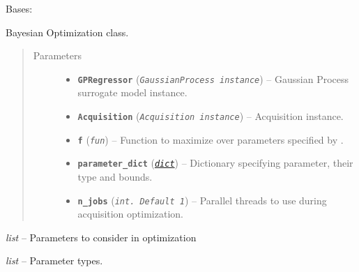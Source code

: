 \documentclass[letterpaper,10pt,english]{sphinxmanual}
\begin{document}
\begin{fulllineitems}
\label{pyGPGO.GPGO:pyGPGO.GPGO.GPGO}
Bases: \href{https://docs.python.org/2/library/functions.html\#object}{}

Bayesian Optimization class.
\begin{quote}\begin{description}
\item[{Parameters}] \leavevmode\begin{itemize}
\item {} 
\textbf{\texttt{GPRegressor}} (\emph{\texttt{GaussianProcess instance}}) -- Gaussian Process surrogate model instance.

\item {} 
\textbf{\texttt{Acquisition}} (\emph{\texttt{Acquisition instance}}) -- Acquisition instance.

\item {} 
\textbf{\texttt{f}} (\emph{\texttt{fun}}) -- Function to maximize over parameters specified by .

\item {} 
\textbf{\texttt{parameter\_dict}} (\href{https://docs.python.org/2/library/stdtypes.html\#dict}{\emph{\texttt{dict}}}) -- Dictionary specifying parameter, their type and bounds.

\item {} 
\textbf{\texttt{n\_jobs}} (\emph{\texttt{int. Default 1}}) -- Parallel threads to use during acquisition optimization.

\end{itemize}

\end{description}\end{quote}

\begin{fulllineitems}
\label{pyGPGO.GPGO:pyGPGO.GPGO.GPGO.parameter_key}
\emph{list} -- Parameters to consider in optimization

\end{fulllineitems}


\begin{fulllineitems}
\label{pyGPGO.GPGO:pyGPGO.GPGO.GPGO.parameter_type}
\emph{list} -- Parameter types.


\end{fulllineitems}
\end{fulllineitems}
\end{document}
